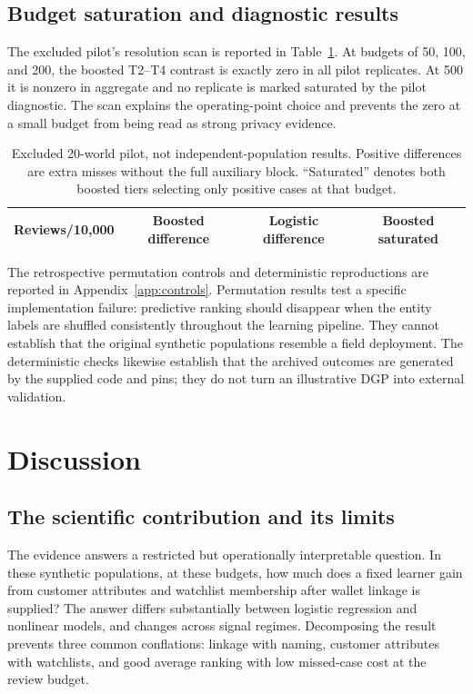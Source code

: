 \documentclass[11pt,a4paper]{article}
\begin{document}
\subsection{Budget saturation and diagnostic results}
The excluded pilot's resolution scan is reported in Table~\ref{tab:resolution}. At budgets of 50, 100, and 200, the boosted T2--T4 contrast is exactly zero in all pilot replicates. At 500 it is nonzero in aggregate and no replicate is marked saturated by the pilot diagnostic. The scan explains the operating-point choice and prevents the zero at a small budget from being read as strong privacy evidence.
\begin{table}[htbp]\centering\small
\caption{Excluded 20-world pilot, not independent-population results. Positive differences are extra misses without the full auxiliary block. ``Saturated'' denotes both boosted tiers selecting only positive cases at that budget.}\label{tab:resolution}
\begin{tabular}{rccc}\toprule Reviews/10,000 & Boosted difference & Logistic difference & Boosted saturated \\\midrule
\end{tabular}
\end{table}

The retrospective permutation controls and deterministic reproductions are reported in Appendix~\ref{app:controls}. Permutation results test a specific implementation failure: predictive ranking should disappear when the entity labels are shuffled consistently throughout the learning pipeline. They cannot establish that the original synthetic populations resemble a field deployment. The deterministic checks likewise establish that the archived outcomes are generated by the supplied code and pins; they do not turn an illustrative DGP into external validation.

\section{Discussion}
\subsection{The scientific contribution and its limits}
The evidence answers a restricted but operationally interpretable question. In these synthetic populations, at these budgets, how much does a fixed learner gain from customer attributes and watchlist membership after wallet linkage is supplied? The answer differs substantially between logistic regression and nonlinear models, and changes across signal regimes. Decomposing the result prevents three common conflations: linkage with naming, customer attributes with watchlists, and good average ranking with low missed-case cost at the review budget.
\end{document}
